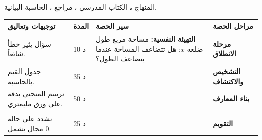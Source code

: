 \documentclass[12pt,a4paper]{article}
\newenvironment{LTR}{\begin{otherlanguage}{english}}{\end{otherlanguage}}
\newcommand{\ar}[1]{\foreignlanguage{arabic}{#1}}
\newcommand{\R}{\mathbb{R}}
\newcommand{\Phase}[1]{\textbf{#1}}
\newenvironment{Sayr}{%
\begin{LTR}\renewcommand{\arraystretch}{1.25}
\begin{longtable}{|p{0.17\textwidth}|>{\centering\arraybackslash}p{0.06\textwidth}|p{0.53\textwidth}|>{\centering\arraybackslash}p{0.12\textwidth}|}
\hline\rowcolor{cThm!12}\ar{\textbf{توجيهات وتعاليق}} & \ar{\textbf{المدة}} & \ar{\textbf{سير الحصة}} & \ar{\textbf{مراحل الحصة}}\\\hline\endhead
\hline\endfoot}{\end{longtable}\end{LTR}}
\newcommand{\Row}[4]{\ar{\small #4} & \ar{#3} & \ar{#2} & \cellcolor{cThm!8}\ar{\Phase{#1}}\\\hline}
\newcommand{\Lab}[2]{\foreignlanguage{english}{\tcbox[on line,colback=#1,colframe=#1,boxrule=0pt,arc=2pt,boxsep=1pt,left=5pt,right=5pt,top=1pt,bottom=1pt]{\ar{\textcolor{white}{\textbf{#2}}}}}}
\newcommand{\Num}[1]{\foreignlanguage{english}{\tikz[baseline=(c.base)]\node[fill=cDef,text=white,inner sep=2pt,font=\footnotesize\bfseries](c){#1};}}
\newcommand{\ck}{\ensuremath{{\color{cRem}\checkmark}}}
\begin{document}
{المنهاج ، الكتاب المدرسي ، مراجع ، الحاسبة البيانية.}
\begin{Sayr}
\Row{مرحلة الانطلاق}{%
\textbf{التهيئة النفسية:} مساحة مربع طول ضلعه $x$: هل تتضاعف المساحة عندما يتضاعف الطول؟}{10 د}{سؤال يثير خطأ شائعاً.}
\Row{التشخيص والاكتشاف}{%
\Lab{cEx}{مناقشة نشاط 01 صفحة 82}\par\ck\ مساحة قطعة أرض مربعة طول ضلعها $x$: $f(x)=x^2$ ، والمساحة لا تتجاوز $3600$ m² ، إذن $x\in[0;60]$.\par
\ck\ الجدول: $f(0)=0$ ، $f(10)=100$ ، $f(20)=400$ ، $f(30)=900$ ، $f(40)=1600$ ، $f(50)=2500$.\par
\ck\ كلما زاد الطول زادت المساحة ، وكلما نقص نقصت: $f$ \textbf{متزايدة} على $[0;60]$.\par
}{35 د}{جدول القيم بالحاسبة.}
\Row{بناء المعارف}{%
\Lab{cThm}{خاصية}\ الدالة مربع $x\mapsto x^2$ معرفة على $\R$ ، و $\dfrac{f(b)-f(a)}{b-a}=a+b$.\par\ck\ على $[0;+\infty[$: $a+b>0$: متزايدة تماماً ؛ على $]-\infty;0]$: $a+b<0$: متناقصة تماماً.\par
\ck\ الدالة زوجية ، ومنحناها \textbf{قطع مكافئ} رأسه المبدأ ومحور تناظره محور التراتيب.\par
\Lab{cMeth}{المقارنة}\ $-3<-2{,}5\leqslant0$ والدالة متناقصة على $]-\infty;0]$ ، إذن $(-3)^2>(-2{,}5)^2$.\par}{50 د}{نرسم المنحنى بدقة على ورق مليمتري.}
\Row{}{%
\Lab{cEx}{التمثيل بدالة مرجعية}\ منحنى $g(x)=(x-1)^2+2$ هو صورة منحنى $x^2$ بالانسحاب الذي شعاعه $\vec v(1;2)$ ، وقيمته الحدية الصغرى $2$ عند $x=1$.\par\smallskip\begin{LTR}\centering\begin{tikzpicture}[x=0.6cm,y=0.45cm,font=\scriptsize]
\draw[gray!25] (-2.5,-0.5) grid (4,5.5);
\draw[->] (-2.6,0)--(4.2,0) node[right]{$x$}; \draw[->] (0,-0.6)--(0,5.7) node[above]{$y$};
\draw[cDef,thick,domain=-2.2:2.2] plot (\x,{\x*\x}) node[above]{$x^2$};
\draw[cThm,thick,domain=-0.9:2.9] plot (\x,{(\x-1)*(\x-1)+2}) node[right]{$(x-1)^2+2$};
\draw[cRem,->,thick] (0,0)--(1,2);
\end{tikzpicture}\end{LTR}\par\Lab{cThm!80!black}{حذار}\ $x^2\geqslant x$ ليست صحيحة دائماً (مثلاً $x=0{,}5$).}{}{}
\Row{التقويم}{%
\Lab{cEx}{تطبيق}\par\Num{1} قارن $(1{,}3)^2$ و $(1{,}31)^2$ ؛ $(-0{,}7)^2$ و $(-0{,}8)^2$. \Num{2} إذا كان $-2\leqslant x\leqslant1$ فما حصر $x^2$ ؟\par\textbf{الحل:} \Num{1} $(1{,}3)^2<(1{,}31)^2$ ؛ $(-0{,}7)^2<(-0{,}8)^2$ ؛ \Num{2} $0\leqslant x^2\leqslant4$ (لأن المجال يشمل $0$).\par\textbf{واجب منزلي:} تمارين من الكتاب المدرسي.\par\smallskip\textbf{ملاحظات حول سير الحصة:} \dotfill}{25 د}{نشدد على حالة مجال يشمل $0$.}
\end{Sayr}
\end{document}
